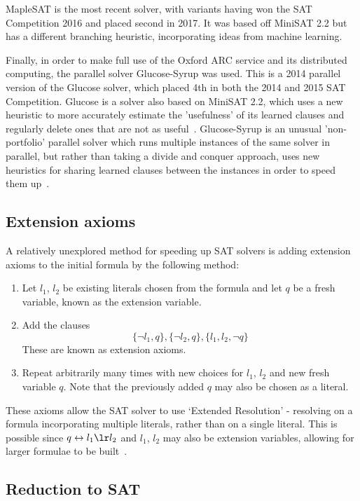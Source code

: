 \documentclass{article}
\begin{document}
MapleSAT is the most recent solver, with variants having won the SAT Competition 2016 and placed second in 2017. It was based off MiniSAT 2.2 but has a different branching heuristic, incorporating ideas from machine learning\cite{maplesat}.

Finally, in order to make full use of the Oxford ARC service and its distributed computing, the parallel solver Glucose-Syrup was used. This is a 2014 parallel version of the Glucose solver, which placed 4th in both the 2014 and 2015 SAT Competition. Glucose is a solver also based on MiniSAT 2.2, which uses a new heuristic to more accurately estimate the 'usefulness' of its learned clauses and regularly delete ones that are not as useful~\cite{glucose}. Glucose-Syrup is an unusual 'non-portfolio' parallel solver which runs multiple instances of the same solver in parallel, but rather than taking a divide and conquer approach, uses new heuristics for sharing learned clauses between the instances in order to speed them up~\cite{glucose-syrup}.

\subsection{Extension axioms}

A relatively unexplored method for speeding up SAT solvers is adding extension axioms to the initial formula by the following method:

\begin{enumerate}
  \item Let $l_1$, $l_2$ be existing literals chosen from the formula and let $q$ be a fresh variable, known as the extension variable.
  \item Add the clauses
  \[
    \{\neg l_1, q\}, \{\neg l_2, q\}, \{l_1, l_2, \neg q\}
  \]
  These are known as extension axioms.
  \item Repeat arbitrarily many times with new choices for $l_1$, $l_2$ and new fresh variable $q$. Note that the previously added $q$ may also be chosen as a literal.
\end{enumerate}

These axioms allow the SAT solver to use `Extended Resolution' - resolving on a formula incorporating multiple literals, rather than on a single literal. This is possible since $q \leftrightarrow l_1 \lr l_2$ and $l_1$, $l_2$ may also be extension variables, allowing for larger formulae to be built~\cite{krajicek}.

\subsection{Reduction to SAT}
\end{document}
